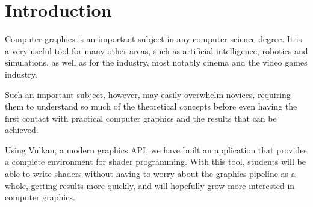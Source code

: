 \section{Introduction}
Computer graphics is an important subject in any computer science degree. It is a very useful tool for many other areas, such as artificial intelligence, robotics and simulations, as well as for the industry, most notably cinema and the video games industry.

Such an important subject, however, may easily overwhelm novices, requiring them to understand so much of the theoretical concepts before even having the first contact with practical computer graphics and the results that can be achieved.

Using Vulkan, a modern graphics API, we have built an application that provides a complete environment for shader programming. With this tool, students will be able to write shaders without having to worry about the graphics pipeline as a whole, getting results more quickly, and will hopefully grow more interested in computer graphics.


